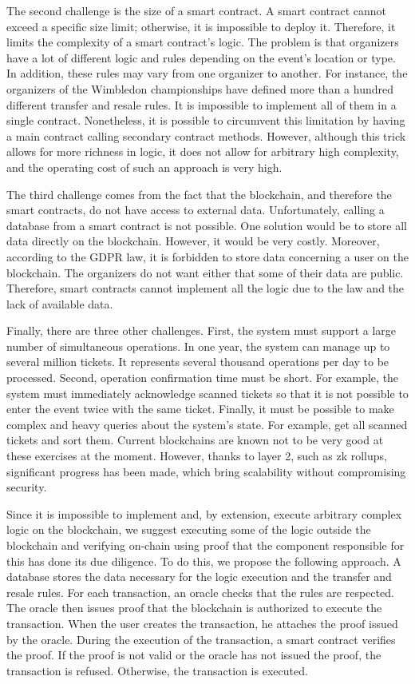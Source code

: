 \documentclass[a4paper,11pt,oneside]{report}
\begin{document}
The second challenge is the size of a smart contract. A smart contract cannot exceed a specific size limit; otherwise, it is impossible to deploy it. Therefore, it limits the complexity of a smart contract's logic. The problem is that organizers have a lot of different logic and rules depending on the event's location or type. In addition, these rules may vary from one organizer to another. For instance, the organizers of the Wimbledon championships have defined more than a hundred different transfer and resale rules. It is impossible to implement all of them in a single contract. Nonetheless, it is possible to circumvent this limitation by having a main contract calling secondary contract methods. However, although this trick allows for more richness in logic, it does not allow for arbitrary high complexity, and the operating cost of such an approach is very high.

The third challenge comes from the fact that the blockchain, and therefore the smart contracts, do not have access to external data. Unfortunately, calling a database from a smart contract is not possible. One solution would be to store all data directly on the blockchain. However, it would be very costly. Moreover, according to the GDPR law, it is forbidden to store data concerning a user on the blockchain. The organizers do not want either that some of their data are public. Therefore, smart contracts cannot implement all the logic due to the law and the lack of available data.

Finally, there are three other challenges. First, the system must support a large number of simultaneous operations. In one year, the system can manage up to several million tickets. It represents several thousand operations per day to be processed. Second, operation confirmation time must be short. For example, the system must immediately acknowledge scanned tickets so that it is not possible to enter the event twice with the same ticket. Finally, it must be possible to make complex and heavy queries about the system's state. For example, get all scanned tickets and sort them. Current blockchains are known not to be very good at these exercises at the moment. However, thanks to layer 2, such as zk rollups, significant progress has been made, which bring scalability without compromising security.

Since it is impossible to implement and, by extension, execute arbitrary complex logic on the blockchain, we suggest executing some of the logic outside the blockchain and verifying on-chain using proof that the component responsible for this has done its due diligence. To do this, we propose the following approach. A database stores the data necessary for the logic execution and the transfer and resale rules. For each transaction, an oracle checks that the rules are respected. The oracle then issues proof that the blockchain is authorized to execute the transaction. When the user creates the transaction, he attaches the proof issued by the oracle. During the execution of the transaction, a smart contract verifies the proof. If the proof is not valid or the oracle has not issued the proof, the transaction is refused. Otherwise, the transaction is executed.
\end{document}
